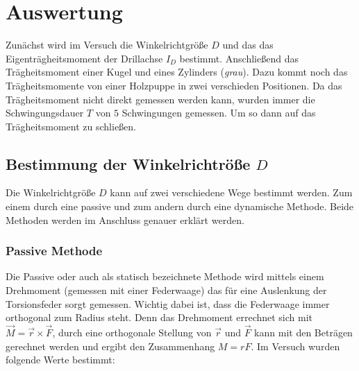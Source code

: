 \section{Auswertung}

Zunächst wird im Versuch die Winkelrichtgröße $D$ und das
das Eigenträgheitsmoment der Drillachse $I_D$ bestimmt. %
Anschließend das Trägheitsmoment einer Kugel und eines Zylinders (\emph{grau}).
Dazu kommt noch das Trägheitsmomente von einer Holzpuppe in zwei verschieden Positionen. %
Da das Trägheitsmoment nicht direkt gemessen werden kann, wurden immer
die Schwingungsdauer $T$ von $5$ Schwingungen gemessen.
Um so dann auf das Trägheitsmoment zu schließen.  %

\subsection{Bestimmung der Winkelrichtröße $D$}

Die Winkelrichtgröße $D$ kann auf zwei verschiedene Wege bestimmt werden.
Zum einem durch eine passive und zum andern durch eine dynamische Methode. %
Beide Methoden werden im Anschluss genauer erklärt werden.

\subsubsection{Passive Methode}

Die Passive oder auch als statisch bezeichnete Methode wird mittels einem Drehmoment (gemessen mit einer Federwaage)
das für eine Auslenkung der Torsionsfeder sorgt gemessen. %
Wichtig dabei ist, dass die Federwaage immer orthogonal zum Radius steht.
Denn das Drehmoment errechnet sich mit $\vec{M}=\vec{r}\times\vec{F}$, durch
eine orthogonale Stellung von $\vec{r}$ und $\vec{F}$ kann mit den Beträgen %
gerechnet werden und ergibt den Zusammenhang $M=rF$.
Im Versuch wurden folgende Werte bestimmt:


